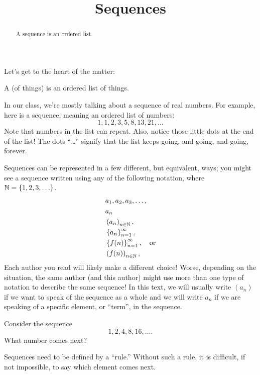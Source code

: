 \documentclass{ximera}
\title[Dig-In:]{Sequences}
\begin{document}
\begin{abstract}
  A sequence is an ordered list.
\end{abstract}
\maketitle


Let's get to the heart of the matter:

\begin{definition}
  A  (of things) is an ordered list of things.
\end{definition}

In our class, we're mostly talking about a sequence of real numbers.
For example, here is a sequence, meaning an ordered list of numbers:
\[
1,1, 2, 3, 5, 8, 13, 21, \ldots
\]
Note that numbers in the list can repeat.  Also, notice those little
dots at the end of the list!  The dots ``\ldots'' signify that the list keeps
going, and going, and going, forever.

Sequences can be represented in a few different, but equivalent, ways;
you might see a sequence written using any of the following notation, where $\mathbb N=\{1,2,3,\ldots\}$.
\begin{align*}
  & a_1, a_2,  a_3, \ldots, \\
  & a_n \\
  & \left(a_n\right)_{n \in \mathbb N}, \\
  & \left\{a_n\right\}_{n=1}^\infty, \\
  & \left\{f(n)\right\}_{n=1}^\infty, \quad \text{or} \\
  & \left(f(n)\right)_{n \in \mathbb N},
\end{align*}
Each author you read will likely make a different choice! Worse, depending on the
situation, the same author (and this author) might use more than one type of
notation to describe the same sequence!  In this text, we will usually write $(a_n)$ if we want to
speak of the sequence as a whole and we will write $a_n$ if we are speaking of
a specific element, or ``term'', in the sequence.


\begin{question}
  Consider the sequence
  \[
  1, 2, 4, 8, 16, \dots.
  \]
  What number comes next?
  \begin{multipleChoice}
  \end{multipleChoice}
  \begin{feedback}
    Sequences need to be defined by a ``rule.'' Without such a rule,
    it is difficult, if not impossible, to say which element comes
    next.
  \end{feedback}
\end{question}
\end{document}
